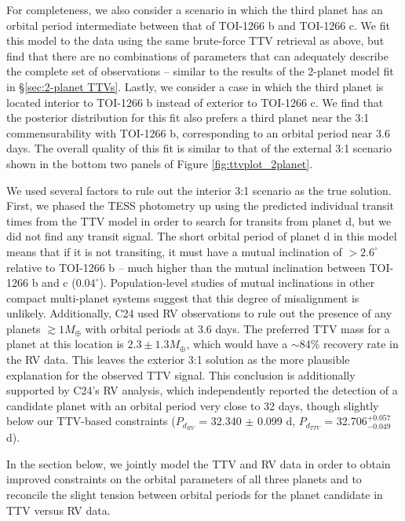 \documentclass[twocolumn]{aastex631}
\begin{document}
For completeness, we also consider a scenario in which the third planet has an orbital period intermediate between that of TOI-1266 b and TOI-1266 c.  We fit this model to the data using the same brute-force TTV retrieval as above, but find that there are no combinations of parameters that can adequately describe the complete set of observations -- similar to the results of the 2-planet model fit in \S\ref{sec:2-planet TTVs}. Lastly, we consider a case in which the third planet is located interior to TOI-1266 b instead of exterior to TOI-1266 c. We find that the posterior distribution for this fit also prefers a third planet near the 3:1 commensurability with TOI-1266 b, corresponding to an orbital period near 3.6 days. The overall quality of this fit is similar to that of the external 3:1 scenario shown in the bottom two panels of Figure \ref{fig:ttvplot_2planet}. 

We used several factors to rule out the interior 3:1 scenario as the true solution. First, we phased the TESS photometry up using the predicted individual transit times from the TTV model in order to search for transits from planet d, but we did not find any transit signal.  The short orbital period of planet d in this model means that if it is not transiting, it must have a mutual inclination of $> 2.6^{\circ}$ relative to TOI-1266 b -- much higher than the mutual inclination between TOI-1266 b and c ($0.04^{\circ}$). Population-level studies of mutual inclinations in other compact multi-planet systems \citep[e.g.,][]{mutual_incs} suggest that this degree of misalignment is unlikely. Additionally, C24 used RV observations to rule out the presence of any planets $\gtrsim 1 M_{\oplus}$ with orbital periods at 3.6 days. The preferred TTV mass for a planet at this location is $2.3 \pm 1.3 M_{\oplus}$, which would have a $\sim$84\% recovery rate in the RV data. This leaves the exterior 3:1 solution as the more plausible explanation for the observed TTV signal. This conclusion is additionally supported by C24's RV analysis, which independently reported the detection of a candidate planet with an orbital period very close to 32 days, though slightly below our TTV-based constraints ($P_{d_{RV}}$ = 32.340 $\pm$ 0.099 d, $P_{d_{TTV}}$ = 32.706$^{+0.057}_{-0.049}$ d).  
 
In the section below, we jointly model the TTV and RV data in order to obtain improved constraints on the orbital parameters of all three planets and to reconcile the slight tension between orbital periods for the planet candidate in TTV versus RV data. 
\end{document}
